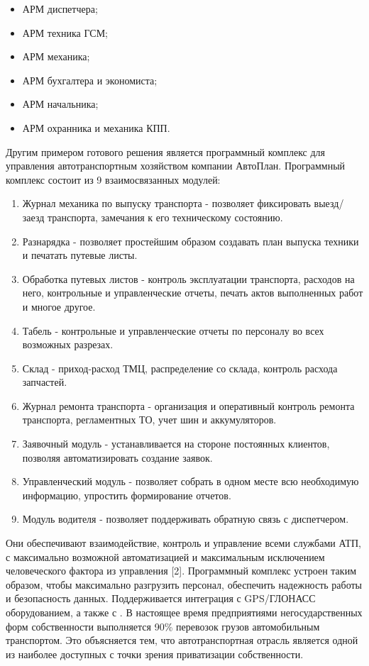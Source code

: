 \documentclass{lstu-diploma}
\begin{document}
\begin{itemize}
	\item АРМ диспетчера;
	\item АРМ техника ГСМ;
	\item АРМ механика;
	\item АРМ бухгалтера и экономиста;
	\item АРМ начальника;
	\item АРМ охранника и механика КПП.
\end{itemize}

Другим примером готового решения является программный комплекс для управления
автотранспортным хозяйством  компании АвтоПлан. Программный
комплекс состоит из 9 взаимосвязанных модулей:
\begin{enumerate}
	\item Журнал механика по выпуску транспорта - позволяет фиксировать
		выезд/заезд транспорта, замечания к его техническому состоянию.
	\item Разнарядка - позволяет простейшим образом создавать план выпуска
		техники и печатать путевые листы.
	\item Обработка путевых листов - контроль эксплуатации транспорта,
		расходов на него, контрольные и управленческие отчеты, печать актов
		выполненных работ и многое другое.
	\item Табель - контрольные и управленческие отчеты по персоналу во всех
		возможных разрезах.
	\item Склад - приход-расход ТМЦ, распределение со склада, контроль расхода
		запчастей.
	\item Журнал ремонта транспорта - организация и оперативный контроль
		ремонта транспорта, регламентных ТО, учет шин и аккумуляторов.
	\item Заявочный модуль - устанавливается на стороне постоянных клиентов,
		позволяя автоматизировать создание заявок.
	\item Управленческий модуль - позволяет собрать в одном месте всю
		необходимую информацию, упростить формирование отчетов.
	\item Модуль водителя - позволяет поддерживать обратную связь с
		диспетчером.
\end{enumerate}

Они обеспечивают взаимодействие, контроль и управление всеми службами АТП, с
максимально возможной автоматизацией и максимальным исключением человеческого
фактора из управления [2].
Программный комплекс устроен таким образом, чтобы максимально разгрузить
персонал, обеспечить надежность работы и безопасность данных.
Поддерживается интеграция с GPS/ГЛОНАСС оборудованием, а также с
.
В настоящее время предприятиями негосударственных форм собственности выполняется
90\% перевозок грузов автомобильным транспортом. Это объясняется тем, что
автотранспортная отрасль является одной из наиболее доступных с точки зрения
приватизации собственности.
\end{document}
